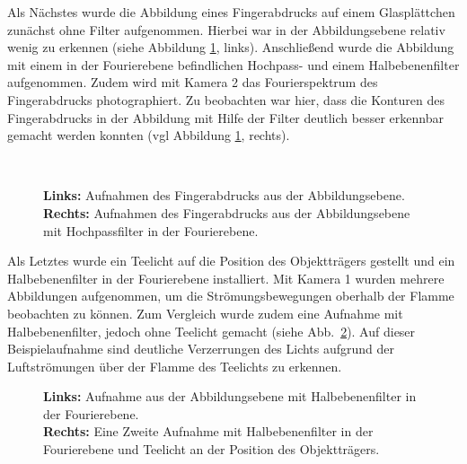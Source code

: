 \clearpage\newpage %
Als Nächstes wurde die Abbildung eines Fingerabdrucks auf einem Glasplättchen zunächst ohne Filter aufgenommen. Hierbei war in der Abbildungsebene relativ wenig zu erkennen (siehe Abbildung \ref{fig:example20_Hochpass}, links). Anschließend wurde die Abbildung mit einem in der Fourierebene befindlichen Hochpass- und einem Halbebenenfilter aufgenommen. Zudem wird mit Kamera 2 das Fourierspektrum des Fingerabdrucks photographiert. Zu beobachten war hier, dass die Konturen des Fingerabdrucks in der Abbildung mit Hilfe der Filter deutlich besser erkennbar gemacht werden konnten (vgl Abbildung \ref{fig:example20_Hochpass}, rechts).\\


\begin{figure}[h]
	\centering
	\\
	\caption{
		\textbf{Links:} Aufnahmen des Fingerabdrucks aus der Abbildungsebene.\\
		\textbf{Rechts:} Aufnahmen des Fingerabdrucks aus der Abbildungsebene mit Hochpassfilter in der Fourierebene.
	}
	\label{fig:example20_Hochpass}
\end{figure}

Als Letztes wurde ein Teelicht auf die Position des Objektträgers gestellt und ein Halbebenenfilter in der Fourierebene installiert. Mit Kamera 1 wurden mehrere Abbildungen aufgenommen, um die Strömungsbewegungen oberhalb der Flamme beobachten zu können. Zum Vergleich wurde zudem eine Aufnahme mit Halbebenenfilter, jedoch ohne Teelicht gemacht (siehe Abb.~\ref{fig:Halbebenenfilter_mit_und_ohne_Teelicht}). Auf dieser Beispielaufnahme sind deutliche Verzerrungen des Lichts aufgrund der Luftströmungen über der Flamme des Teelichts zu erkennen. 

\begin{figure}[h]
	\centering
	\caption[Schlieren]{
		\textbf{Links:} Aufnahme aus der Abbildungsebene mit Halbebenenfilter in der Fourierebene.\\
		\textbf{Rechts:} Eine Zweite Aufnahme mit Halbebenenfilter in der Fourierebene und Teelicht an der Position des Objektträgers.}
	\label{fig:Halbebenenfilter_mit_und_ohne_Teelicht}
\end{figure}

